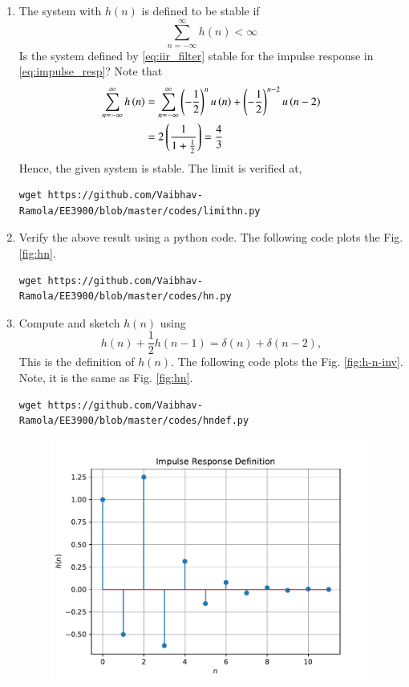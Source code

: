 \documentclass[journal,12pt,twocolumn]{IEEEtran}
\renewcommand\thesection{\arabic{section}}
\begin{document}
\begin{enumerate}[label=\thesection.\arabic*]
\item The system with $h(n)$ is defined to be stable if
\begin{equation}
	\sum_{n=-\infty}^{\infty}h(n) < \infty
\end{equation}
Is the system defined by \eqref{eq:iir_filter} stable for the impulse response in \eqref{eq:impulse_resp}?
\solution
Note that
\begin{align}
	\sum_{n = -\infty}^{\infty}h\left(n\right) &= \sum_{n = -\infty}^{\infty}
	\left(-\frac{1}{2}\right)^nu\left(n\right) + \left(-\frac{1}{2}\right)^{n - 2}u\left(n - 2\right) \\
	&= 2\left(\frac{1}{1 + \frac{1}{2}}\right) = \frac{4}{3}
\end{align}
Hence, the given system is stable. The limit is verified at,
\begin{lstlisting}
wget https://github.com/Vaibhav-Ramola/EE3900/blob/master/codes/limithn.py
\end{lstlisting}
\item Verify the above result using a python code.
\solution The following code plots the Fig. \eqref{fig:hn}.
\begin{lstlisting}
wget https://github.com/Vaibhav-Ramola/EE3900/blob/master/codes/hn.py
\end{lstlisting}	
\item 
Compute and sketch $h(n)$ using 
\begin{equation}
	\label{eq:iir_filter_h}
	h(n) + \frac{1}{2}h(n-1) = \delta(n) + \delta(n-2), 
\end{equation}
This is the definition of $h(n)$.
\solution The following code plots the Fig. \eqref{fig:h-n-inv}. Note, it is
the same as Fig. \eqref{fig:hn}.
\begin{lstlisting}
wget https://github.com/Vaibhav-Ramola/EE3900/blob/master/codes/hndef.py
\end{lstlisting}
\begin{figure}[!ht]
	\centering
	\includegraphics[width=\columnwidth]{./figs/hndef}

\end{figure}
\end{enumerate}
\end{document}
